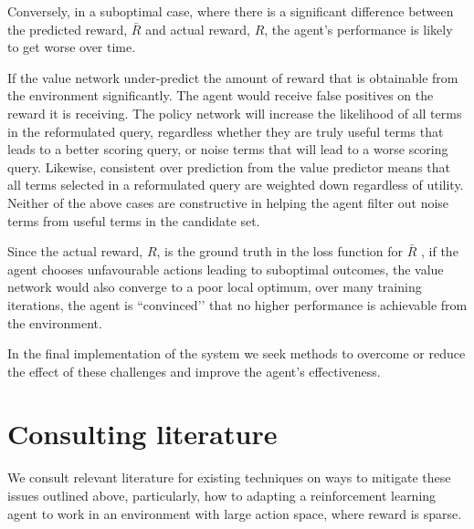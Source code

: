 Conversely, in a suboptimal case, where there is a significant difference between the predicted reward, $\bar{R}$ and actual reward, $R$, the agent’s performance is likely to get worse over time. 

If the value network under-predict the amount of reward that is obtainable from the environment significantly. The agent would receive false positives on the reward it is receiving.  The policy network will increase the likelihood of all terms in the reformulated query, regardless whether they are truly useful terms that leads to a better scoring query, or noise terms that will lead to a worse scoring query. Likewise, consistent over prediction from the value predictor means that all terms selected in a reformulated query are weighted down regardless of utility. Neither of the above cases are constructive in helping the agent filter out noise terms from useful terms in the candidate set. 

Since the actual reward, $R$, is the ground truth in the loss function for $\bar{R}$ , if the agent chooses unfavourable actions leading to suboptimal outcomes, the value network would also converge to a poor local optimum, over many training iterations, the agent is ``convinced’’ that no higher performance is achievable from the environment. 


In the final implementation of the system we seek methods to overcome or reduce the effect of these challenges and improve the agent's effectiveness. 




\section{Consulting literature}

We consult relevant literature for existing techniques on ways to mitigate these issues outlined above, particularly, how to adapting a reinforcement learning agent to work in an environment with large action space, where reward is sparse. 

